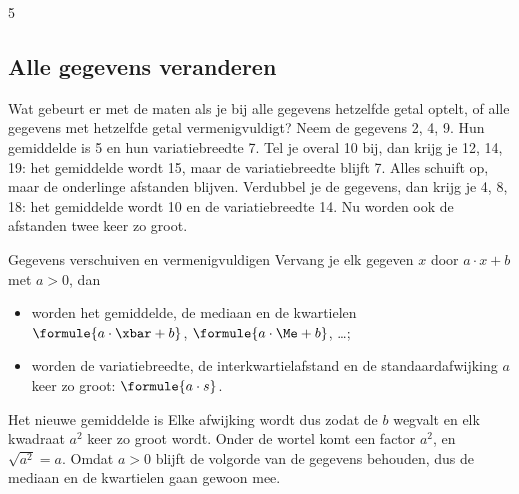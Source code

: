 \begin{alleenvoor}{5}
\subsection{Alle gegevens veranderen}

Wat gebeurt er met de maten als je bij alle gegevens hetzelfde getal optelt, of alle gegevens met hetzelfde getal vermenigvuldigt? Neem de gegevens 2, 4, 9. Hun gemiddelde is 5 en hun variatiebreedte 7. Tel je overal 10 bij, dan krijg je 12, 14, 19: het gemiddelde wordt 15, maar de variatiebreedte blijft 7. Alles schuift op, maar de onderlinge afstanden blijven. Verdubbel je de gegevens, dan krijg je 4, 8, 18: het gemiddelde wordt 10 en de variatiebreedte 14. Nu worden ook de afstanden twee keer zo groot.

\begin{theorie}
\begin{stelling}{Gegevens verschuiven en vermenigvuldigen}
Vervang je elk gegeven $x$ door $a \cdot x + b$ met $a > 0$, dan
\begin{itemize}
  \item worden het gemiddelde, de mediaan en de kwartielen $\formule{a \cdot \xbar + b}$, $\formule{a \cdot \Me + b}$, \dots;
  \item worden de variatiebreedte, de interkwartielafstand en de standaardafwijking $a$ keer zo groot: $\formule{a \cdot s}$.
\end{itemize}
\end{stelling}
\begin{bewijs}
Het nieuwe gemiddelde is
Elke afwijking wordt dus
zodat de $b$ wegvalt en elk kwadraat $a^2$ keer zo groot wordt. Onder de wortel komt een factor $a^2$, en $\sqrt{a^2} = a$. Omdat $a > 0$ blijft de volgorde van de gegevens behouden, dus de mediaan en de kwartielen gaan gewoon mee.
\end{bewijs}
\end{theorie}


\begin{oefeningen}
\end{oefeningen}
\end{alleenvoor}


